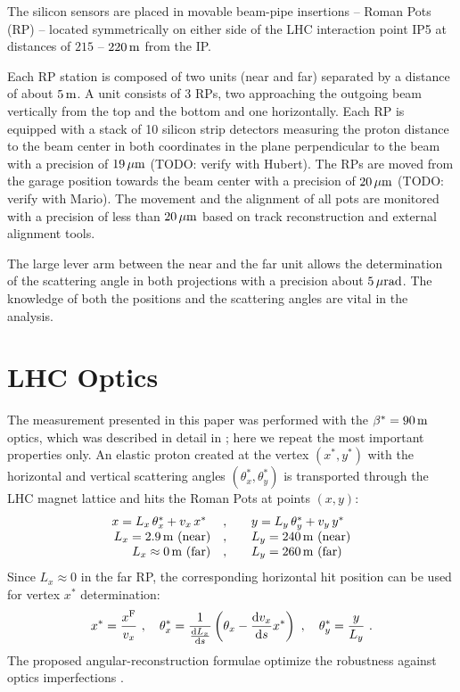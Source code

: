 \documentclass[doublecol]{../macros/epl2}
\def\d{{\rm d}}
\def\un#1{\,{\rm #1}}
\begin{document}
The silicon sensors are placed in movable beam-pipe insertions -- Roman Pots (RP) -- located symmetrically on either side of the LHC interaction point IP5 at distances of $215$ -- $220\un{m}$ from the IP.

Each RP station is composed of two units (near and far) separated by a distance of about $5\un{m}$. A unit consists of 3 RPs, two approaching the outgoing beam vertically from the top and the bottom and one horizontally. Each RP is equipped with a stack of 10 silicon strip detectors measuring the proton distance to the beam center in both coordinates in the plane perpendicular to the beam with a precision of $19\un{\mu m}$ (TODO: verify with Hubert). The RPs are moved from the garage position towards the beam center with a precision of $20\un{\mu m}$ (TODO: verify with Mario). The movement and the alignment of all pots are monitored with a precision of less than $20\un{\mu m}$ based on track reconstruction and external alignment tools.

The large lever arm between the near and the far unit allows the determination of the scattering angle in both projections with a precision about $5\un{\mu rad}$. The knowledge of both the positions and the scattering angles are vital in the analysis. 



\section{LHC Optics}

The measurement presented in this paper was performed with the $\beta^*=90\un{m}$ optics, which was described in detail in \cite{epl96}; here we repeat the most important properties only. An elastic proton created at the vertex $(x^*, y^*)$ with the horizontal and vertical scattering angles $(\theta_x^*, \theta_y^*)$ is transported through the LHC magnet lattice and hits the Roman Pots at points $(x, y)$:
\begin{equation}
\label{eq:transport}
\begin{array}{rcl}
x = L_x\,\theta^*_x + v_x\,x^*\ &,\quad& y = L_y\,\theta^*_y + v_y\,y^* \\
L_x = 2.9\un{m} \hbox{ (near)}&,\quad& L_y = 240\un{m} \hbox{ (near)}\\
L_x \approx 0\un{m} \hbox{ (far)}&,\quad& L_y = 260\un{m}\hbox{ (far)}\\
\end{array}
\end{equation}
Since $L_x \approx 0$ in the far RP, the corresponding horizontal hit position can be used for vertex $x^*$ determination:
\begin{equation}
\label{eq:reconstruction}
x^* = {x^{\rm F}\over v_x}\ ,\quad
\theta^*_x = {1\over {\d L_x\over \d s}} \left( \theta_x - {\d v_x\over \d s} x^* \right)\ ,\quad
\theta^*_y = {y\over L_y}\ .
\end{equation}
The proposed angular-reconstruction formulae optimize the robustness against optics imperfections \cite{epl96}.
\end{document}
